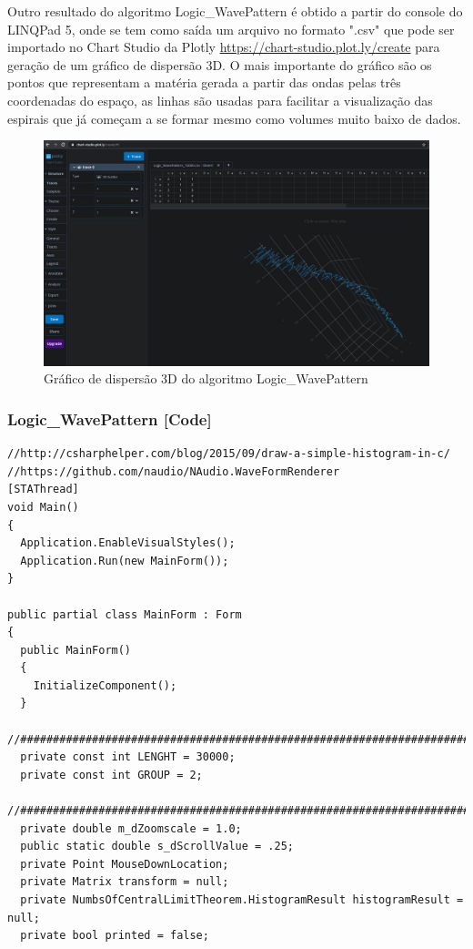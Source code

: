 \begin{apendicesenv}
Outro resultado do algoritmo Logic\_WavePattern é obtido a partir do console do LINQPad 5, onde se tem como saída um arquivo no formato ".csv" que pode ser importado no Chart Studio da Plotly \url{https://chart-studio.plot.ly/create} para geração de um gráfico de dispersão 3D. O mais importante do gráfico são os pontos que representam a matéria gerada a partir das ondas pelas três coordenadas do espaço, as linhas são usadas para facilitar a visualização das espirais que já começam a se formar mesmo como volumes muito baixo de dados. 
\begin{figure}[H]
\caption{Gráfico de dispersão 3D do algoritmo Logic\_WavePattern}
\label{fig:plotly_3DScatter}
\centering
\includegraphics[scale=.33]{sections/images/plotly_3DScatter.jpg}
\end{figure}

\subsubsection*{Logic\_WavePattern [Code]}
\begin{lstlisting}
//http://csharphelper.com/blog/2015/09/draw-a-simple-histogram-in-c/
//https://github.com/naudio/NAudio.WaveFormRenderer
[STAThread]
void Main()
{
  Application.EnableVisualStyles();
  Application.Run(new MainForm());
}

public partial class MainForm : Form
{
  public MainForm()
  {
    InitializeComponent();
  }
  //###########################################################################
  private const int LENGHT = 30000;
  private const int GROUP = 2;
  //###########################################################################
  private double m_dZoomscale = 1.0;
  public static double s_dScrollValue = .25;
  private Point MouseDownLocation;
  private Matrix transform = null;
  private NumbsOfCentralLimitTheorem.HistogramResult histogramResult = null;
  private bool printed = false;


\end{lstlisting}
\end{apendicesenv}
